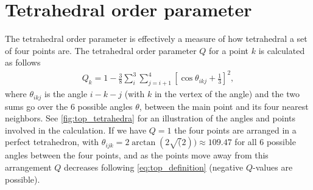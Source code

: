 \section{Tetrahedral order parameter}
The tetrahedral order parameter\cite{errington2001relationship} is effectively a measure of how tetrahedral a set of four points are. The tetrahedral order parameter $Q$ for a point $k$ is calculated as follows%
\begin{align}
    Q_k = 1 - \frac{3}{8}\sum_i^3\sum_{j=i+1}^4 \left[ \cos \theta_{ikj} + \frac{1}{3} \right]^2,\label{eq:top_definition}
\end{align}%
%
%     
%     
%
where $\theta_{ikj}$ is the angle %
$i-k-j$ (with $k$ in the vertex of the angle) %
and the two sums go over the 6 possible angles $\theta$, between the main point and its four nearest neighbors. See \cref{fig:top_tetrahedra} for an illustration of the angles and points involved in the calculation. If we have $Q = 1$ the four points are arranged in a perfect tetrahedron, with $\theta_{ijk} = 2\arctan(2\sqrt(2)) \approx 109.47$ for all 6 possible angles between the four points, and as the points move away from this arrangement $Q$ decreases following \cref{eq:top_definition} (negative $Q$-values are possible).
